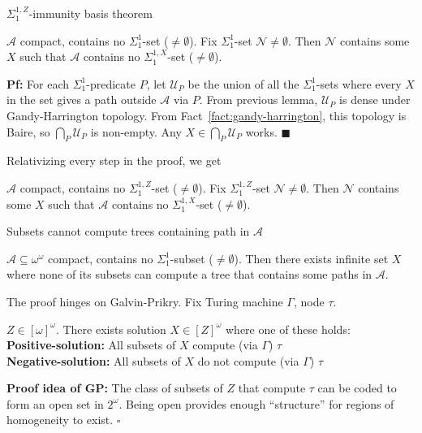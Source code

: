 \begin{frame}{$\Sigma_1^{1,Z}$-immunity basis theorem}
  \begin{thm}
    $\mathcal{A}$ compact, contains no $\Sigma_1^{1}$-set
    ($\neq\emptyset$). Fix $\Sigma_1^{1}$-set
    $\mathcal{N}\neq\emptyset$. Then $\mathcal{N}$ contains some $X$ such
    that $\mathcal{A}$ contains no $\Sigma_1^{1,X}$-set ($\neq\emptyset$).
  \end{thm}
  \textbf{Pf:} For each $\Sigma_1^{1}$-predicate $P$, let $\mathcal{U}_P$
  be the union of all the $\Sigma_1^{1}$-sets where every $X$ in the set
  gives a path outside $\mathcal{A}$ via $P$. From previous lemma,
  $\mathcal{U}_P$ is dense under Gandy-Harrington topology. From
  Fact~\ref{fact:gandy-harrington}, this topology is Baire, so
  $\bigcap_P\mathcal{U}_P$ is non-empty. Any $X\in\bigcap_P\mathcal{U}_P$
  works. $\blacksquare$

  \vspace{1em}
  Relativizing every step in the proof, we get
  \begin{coro}
    $\mathcal{A}$ compact, contains no $\Sigma_1^{1,Z}$-set
    ($\neq\emptyset$). Fix $\Sigma_1^{1,Z}$-set
    $\mathcal{N}\neq\emptyset$. Then $\mathcal{N}$ contains some $X$ such
    that $\mathcal{A}$ contains no $\Sigma_1^{1,X}$-set ($\neq\emptyset$).
  \end{coro}
\end{frame}

\begin{frame}{Subsets cannot compute trees containing path in $\mathcal{A}$}
  \begin{main-thm*}
    $\mathcal{A}\subseteq\omega^\omega$ compact, contains no
    $\Sigma_1^1$-subset ($\neq\emptyset$). Then there exists infinite set
    $X$ where none of its subsets can compute a tree that contains some
    paths in $\mathcal{A}$.
  \end{main-thm*}

  The proof hinges on Galvin-Prikry. Fix Turing machine $\Gamma$, node
  $\tau$.
  \begin{fact*}
    $Z\in[\omega]^\omega$. There exists solution $X\in[Z]^\omega$
    where one of these holds:\\
    \textbf{Positive-solution:} All subsets of $X$ compute (via $\Gamma$)
    $\tau$ \\
    \textbf{Negative-solution:} All subsets of $X$ do not compute (via
    $\Gamma$) $\tau$
  \end{fact*}
  \textbf{Proof idea of GP:} The class of subsets of $Z$ that
  compute $\tau$ can be coded to form an open set in $2^\omega$. Being
  open provides enough ``structure'' for regions of homogeneity to exist.
  $\square$
\end{frame}

